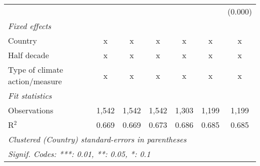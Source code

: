 \begin{tabular}{lcccccc}
                                                    &         &         &                &                &                & (0.000)\\   
   \emph{Fixed effects}\\
   Country                                          & x       & x       & x              & x              & x              & x\\  
   Half decade                                      & x       & x       & x              & x              & x              & x\\  
   Type of climate action/measure                   & x       & x       & x              & x              & x              & x\\  
   \midrule \emph{Fit statistics}\\
   Observations                                     & 1,542   & 1,542   & 1,542          & 1,303          & 1,199          & 1,199\\  
   R$^2$                                            & 0.669   & 0.669   & 0.673          & 0.686          & 0.685          & 0.685\\  
   \midrule
   \multicolumn{7}{l}{\emph{Clustered (Country) standard-errors in parentheses}}\\
   \multicolumn{7}{l}{\emph{Signif. Codes: ***: 0.01, **: 0.05, *: 0.1}}\\
\end{tabular}
\par\endgroup


